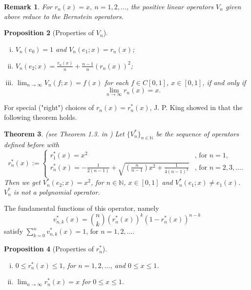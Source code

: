 \documentclass[12pt,leqno,a4paper,dvips,twoside]{article}
\newcommand*{\N}{\ensuremath{\mathbb{N}}}               %
\newtheorem{thm}{Theorem}[section]
\newtheorem{prop}[thm]{Proposition}%
\newtheorem{rema}[thm]{Remark}%
\begin{document}
{\begin{rema}
For $r_n(x)=x,\ n=1,2,\ldots$, the positive linear operators $V_n$ given above reduce to the Bernstein
operators.
\end{rema}

\begin{prop}[Properties of $V_n$]\mbox{}
	\begin{enumerate}[i)]
		\item
			$V_n(e_0)=1$ and $V_n(e_1;x)=r_n(x)$;
		\item
			$V_n(e_2;x)=\frac{r_n(x)}{n}+\frac{n-1}{n}(r_n(x))^2$;
		\item
			$\lim_{n\to\infty}V_n(f;x)=f(x)$ for each $f\in C[0,1]$, $x\in [0,1]$, if and 
			only if  
				\begin{equation*}
				\lim_{n\to \infty}r_n(x)=x.
				\end{equation*}
	\end{enumerate}
\end{prop}

For special ("right") choices of $r_n(x)=r^*_n(x)$, J. P. King showed in \cite{king:2003} that the following theorem holds.
\begin{thm} (see Theorem 1.3. in \cite{gopi:2005})
	Let $\{V^*_n\}_{n\in\N}$ be the sequence of operators defined before with
	\begin{equation*}
	r^*_n(x):=
	\begin{cases}
		r^*_1(x)=x^2 & \text{, for } n=1, \\
		r^*_n(x)=-\frac{1}{2(n-1)}+\sqrt{\left(\frac{n}{n-1}\right)x^2+\frac{1}{4(n-1)^2}} & \text{, for } n=2,3,\ldots.
	\end{cases}
	\end{equation*}
	Then we get $V^*_n(e_2;x)=x^2$, for $n\in\N$, $x\in[0,1]$ and $V^*_n(e_1;x)\neq e_1(x)$. 	$V^*_n$ is not a polynomial operator.  
\end{thm}

The fundamental functions of this operator, namely
	\begin{equation*}
		v^*_{n,k}(x)=\binom{n}{k}(r^*_n(x))^k(1-r^*_n(x))^{n-k}
	\end{equation*}
satisfy $\sum^{n}_{k=0}{v^*_{n,k}(x)}=1$, for $n=1,2,\ldots$. 

\begin{prop}[Properties of $r^*_n$]\mbox{}
	\begin{enumerate}[i)]
		\item
			$0\leq r^*_n(x)\leq 1$, for $n=1,2,\ldots$, and $0\leq x \leq 1$.
		\item
			$\lim_{n\to\infty}r^*_n(x)=x$ for $0\leq x\leq 1$.
	\end{enumerate}
\end{prop}

}
\end{document}
